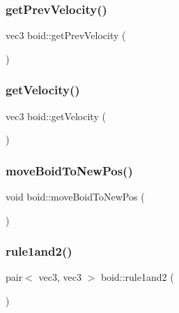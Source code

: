 \subsubsection{\texorpdfstring{get\+Prev\+Velocity()}{getPrevVelocity()}}
{\footnotesize\ttfamily vec3 boid\+::get\+Prev\+Velocity (\begin{DoxyParamCaption}{ }\end{DoxyParamCaption})}

\mbox{\label{classboid_a2d8189207adddd9ac37f0cf3be28da5c}} 
\subsubsection{\texorpdfstring{get\+Velocity()}{getVelocity()}}
{\footnotesize\ttfamily vec3 boid\+::get\+Velocity (\begin{DoxyParamCaption}{ }\end{DoxyParamCaption})}

\mbox{\label{classboid_ab87a1586c29b4d180c2ca0b3e4d4ab0c}} 
\subsubsection{\texorpdfstring{move\+Boid\+To\+New\+Pos()}{moveBoidToNewPos()}}
{\footnotesize\ttfamily void boid\+::move\+Boid\+To\+New\+Pos (\begin{DoxyParamCaption}{ }\end{DoxyParamCaption})}

\mbox{\label{classboid_abbb96bf34e78a462af8d9c66e1f8427f}} 
\subsubsection{\texorpdfstring{rule1and2()}{rule1and2()}}
{\footnotesize\ttfamily pair$<$ vec3, vec3 $>$ boid\+::rule1and2 (\begin{DoxyParamCaption}{ }\end{DoxyParamCaption})}

\mbox{\label{classboid_a71d26e63c117b2d69364076a9d1cf011}} 

